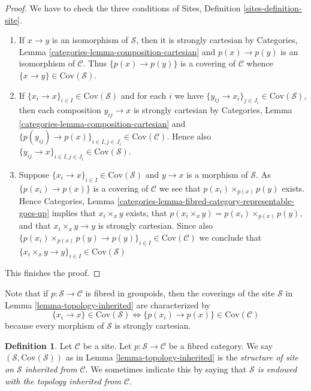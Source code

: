 \documentclass{stacks-project}
\theoremstyle{plain}
\theoremstyle{definition}
\newtheorem{definition}[subsection]{Definition}
\theoremstyle{remark}
\numberwithin{equation}{subsection}
\begin{document}
\begin{proof}
We have to check the three conditions of
Sites, Definition \ref{sites-definition-site}.
\begin{enumerate}
\item If $x \to y$ is an isomorphism of $\mathcal{S}$, then
it is strongly cartesian by
Categories, Lemma \ref{categories-lemma-composition-cartesian}
and $p(x) \to p(y)$ is an isomorphism of $\mathcal{C}$. Thus
$\{p(x) \to p(y)\}$ is a covering of $\mathcal{C}$ whence
$\{x \to y\} \in \text{Cov}(\mathcal{S})$.
\item If $\{x_i \to x\}_{i\in I} \in \text{Cov}(\mathcal{S})$ and for each
$i$ we have $\{y_{ij} \to x_i\}_{j\in J_i} \in \text{Cov}(\mathcal{S})$, then
each composition $y_{ij} \to x$ is strongly cartesian by
Categories, Lemma \ref{categories-lemma-composition-cartesian}
and $\{p(y_{ij}) \to p(x)\}_{i \in I, j\in J_i} \in \text{Cov}(\mathcal{C})$.
Hence also $\{y_{ij} \to x\}_{i \in I, j\in J_i} \in \text{Cov}(\mathcal{S})$.
\item Suppose $\{x_i \to x\}_{i\in I}\in \text{Cov}(\mathcal{S})$
and $y \to x$ is a morphism of $\mathcal{S}$. As $\{p(x_i) \to p(x)\}$
is a covering of $\mathcal{C}$ we see that $p(x_i) \times_{p(x)} p(y)$
exists. Hence
Categories, Lemma \ref{categories-lemma-fibred-category-representable-goes-up}
implies that $x_i \times_x y$ exists, that $p(x_i \times_x y) =
p(x_i) \times_{p(x)} p(y)$, and that $x_i \times_x y \to y$ is
strongly cartesian. Since also
$\{p(x_i) \times_{p(x)} p(y) \to p(y) \}_{i\in I} \in \text{Cov}(\mathcal{C})$
we conclude that
$\{x_i \times_x y \to y \}_{i\in I} \in \text{Cov}(\mathcal{S})$
\end{enumerate}
This finishes the proof.
\end{proof}

\noindent
Note that if $p : \mathcal{S} \to \mathcal{C}$ is fibred in groupoids, then
the coverings of the site $\mathcal{S}$ in
Lemma \ref{lemma-topology-inherited}
are characterized by
$$
\{x_i \to x\} \in \text{Cov}(\mathcal{S})
\Leftrightarrow
\{p(x_i) \to p(x)\} \in \text{Cov}(\mathcal{C})
$$
because every morphism of $\mathcal{S}$ is strongly cartesian.

\begin{definition}
\label{definition-topology-inherited}
Let $\mathcal{C}$ be a site. Let $p : \mathcal{S} \to \mathcal{C}$ be a
fibred category. We say $(\mathcal{S}, \text{Cov}(\mathcal{S}))$ as in
Lemma \ref{lemma-topology-inherited}
is the {\it structure of site on $\mathcal{S}$ inherited from $\mathcal{C}$}.
We sometimes indicate this by saying that
{\it $\mathcal{S}$ is endowed with the topology inherited from $\mathcal{C}$}.
\end{definition}
\end{document}
